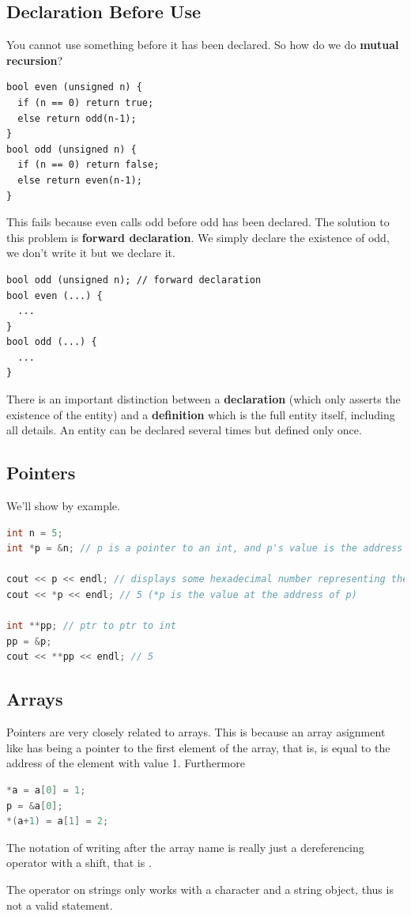 \documentclass[english, 11pt]{article}
\begin{document}
\subsection{Declaration Before Use}

You cannot use something before it has been declared. So how do we do \textbf{mutual recursion}?
\begin{lstlisting}
bool even (unsigned n) {
  if (n == 0) return true;
  else return odd(n-1);
}
bool odd (unsigned n) {
  if (n == 0) return false;
  else return even(n-1);
}
\end{lstlisting}
This fails because even calls odd before odd has been declared. The solution to this problem is \textbf{forward declaration}. We simply declare the existence of odd, we don't write it but we declare it.
\begin{lstlisting}
bool odd (unsigned n); // forward declaration
bool even (...) {
  ...
}
bool odd (...) {
  ...
}
\end{lstlisting}
There is an important distinction between a \textbf{declaration} (which only asserts the existence of the entity) and a \textbf{definition} which is the full entity itself, including all details. An entity can be declared several times but defined only once.

\subsection{Pointers}

We'll show by example.

\begin{lstlisting}[language=c++,numbers=none]
int n = 5;
int *p = &n; // p is a pointer to an int, and p's value is the address of n

cout << p << endl; // displays some hexadecimal number representing the address of n
cout << *p << endl; // 5 (*p is the value at the address of p)

int **pp; // ptr to ptr to int
pp = &p;
cout << **pp << endl; // 5
\end{lstlisting}

\subsection{Arrays}

Pointers are very closely related to arrays. This is because an array asignment like  has  being a pointer to the first element of the array, that is,  is equal to the address of the element with value 1. Furthermore
\begin{lstlisting}[language=c++,numbers=none]
*a = a[0] = 1;
p = &a[0];
*(a+1) = a[1] = 2;
\end{lstlisting}
The notation of writing \tc{[]} after the array name is really just a dereferencing operator with a shift, that is .
\begin{note}
  The \tc{+} operator on strings only works with a character and a string object, thus  is not a valid statement.
\end{note}
\end{document}
